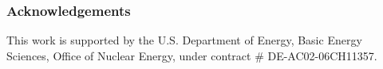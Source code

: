 
\begin{frame}[c]
  \frametitle{Acknowledgements}
This work is supported by the U.S. Department of Energy, Basic Energy Sciences, 
Office of Nuclear Energy, under contract \# DE-AC02-06CH11357.
\end{frame}
